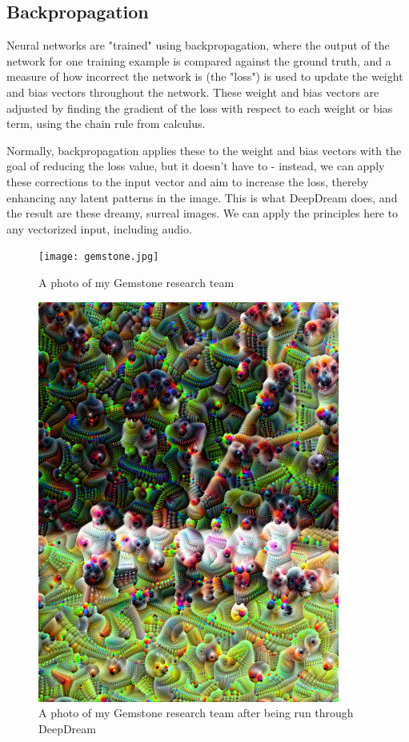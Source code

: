 \documentclass[11pt]{article}
\begin{document}
\subsection{Backpropagation}

Neural networks are "trained" using backpropagation, where the output of the network for one training example is compared against
the ground truth, and a measure of how incorrect the network is (the "loss") is used to update the weight and bias vectors throughout the network.
These weight and bias vectors are adjusted by finding the gradient of the loss with respect to each weight or bias term, using the chain rule from calculus.

Normally, backpropagation applies these to the weight and bias vectors with the goal of reducing the loss value, but it doesn't have to - instead, we can apply these
corrections to the input vector and aim to increase the loss, thereby enhancing any latent patterns in the image. This is what DeepDream does, and the result are these dreamy, surreal images.
We can apply the principles here to any vectorized input, including audio.

\begin{figure}[!htb]
    \texttt{[image: gemstone.jpg]}
    \caption{A photo of my Gemstone research team}
    \label{fig:gemstone}
\end{figure}
\FloatBarrier

\begin{figure}[!htb]
    \includegraphics[width=\linewidth]{deepdreamgemstone.png}
    \caption{A photo of my Gemstone research team after being run through DeepDream}
    \label{fig:gemstonedeepdream}
\end{figure}
\FloatBarrier
\end{document}

